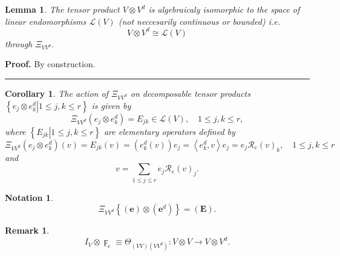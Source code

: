 \documentclass[aps,preprint]{revtex4}%
\newtheorem{corollary}[theorem]{Corollary}
\newtheorem{lemma}[theorem]{Lemma}
\newtheorem{notation}[theorem]{Notation}
\newtheorem{remark}[theorem]{Remark}
\newenvironment{proof}[1][Proof]{\noindent\textbf{#1.} }{\ \rule{0.5em}{0.5em}}
\begin{document}
\begin{lemma}
The tensor product $V\otimes V^{d}$ is algebraicaly isomorphic to the space of
\emph{linear} endomorphisms $\mathcal{L}\left(  V\right)  $ (not neccesarily
continuous or bounded) i.e.
\begin{equation}
V\otimes V^{d}\cong\mathcal{L}\left(  V\right)
\end{equation}
through $\Xi_{VV^{d}}.$
\end{lemma}

\begin{proof}
By construction.
\end{proof}

\begin{corollary}
The action of $\Xi_{VV^{d}}$ on decomposable tensor products $\left\{  \left.
e_{j}\otimes e_{k}^{d}\right\vert 1\leq j,k\leq r\right\}  $ is given by
\begin{equation}
\Xi_{VV^{d}}\left(  e_{j}\otimes e_{k}^{d}\right)  =E_{jk}\in\mathcal{L}%
\left(  V\right)  ,\quad1\leq j,k\leq r,
\end{equation}
where $\left\{  \left.  E_{jk}\right\vert 1\leq j,k\leq r\right\}  $ are
\emph{elementary operators} defined by
\begin{equation}
\Xi_{VV^{d}}\left(  e_{j}\otimes e_{k}^{d}\right)  \left(  v\right)
=E_{jk}\left(  v\right)  =\left(  e_{k}^{d}\left(  v\right)  \right)
e_{j}=\left\langle e_{k}^{d},v\right\rangle e_{j}=e_{j}\mathcal{R}_{e}\left(
v\right)  _{k},\quad1\leq j,k\leq r
\end{equation}
and
\begin{equation}
v=\sum_{1\leq j\leq r}e_{j}\mathcal{R}_{e}\left(  v\right)  _{j}.
\end{equation}

\end{corollary}

\begin{notation}%
\begin{equation}
\Xi_{VV^{d}}\left\{  \left(  \mathbf{e}\right)  \otimes\left(  \mathbf{e}%
^{d}\right)  \right\}  =\left(  \mathbf{E}\right)  .
\end{equation}

\end{notation}

\begin{remark}%
\begin{equation}
I_{V}\otimes\digamma_{e}\equiv\Theta_{\left(  VV\right)  \left(
VV^{d}\right)  }:V\otimes V\rightarrow V\otimes V^{d}.
\end{equation}

\end{remark}
\end{document}
